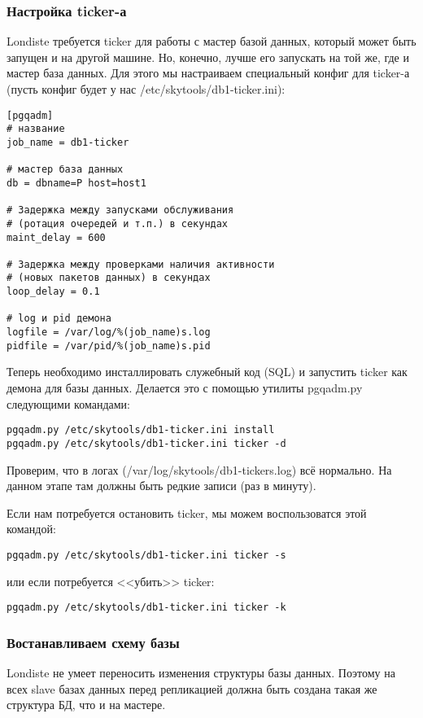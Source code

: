 \subsubsection{Настройка ticker-а}
Londiste требуется ticker для работы с мастер базой данных, который может быть запущен и на другой машине. 
Но, конечно, лучше его запускать на той же, где и мастер база данных. Для этого мы настраиваем специальный 
конфиг для ticker-а (пусть конфиг будет у нас /etc/skytools/db1-ticker.ini):
\begin{lstlisting}[label=lst:londiste5,caption=Настройка ticker-а]
[pgqadm]
# название
job_name = db1-ticker

# мастер база данных 
db = dbname=P host=host1 

# Задержка между запусками обслуживания 
# (ротация очередей и т.п.) в секундах
maint_delay = 600

# Задержка между проверками наличия активности 
# (новых пакетов данных) в секундах
loop_delay = 0.1

# log и pid демона
logfile = /var/log/%(job_name)s.log
pidfile = /var/pid/%(job_name)s.pid
\end{lstlisting}

Теперь необходимо инсталлировать служебный код (SQL) и запустить ticker как демона для базы данных. 
Делается это с помощью утилиты pgqadm.py следующими командами:
\begin{lstlisting}[label=lst:londiste6,caption=Настройка ticker-а]
pgqadm.py /etc/skytools/db1-ticker.ini install
pgqadm.py /etc/skytools/db1-ticker.ini ticker -d
\end{lstlisting}

Проверим, что в логах (/var/log/skytools/db1-tickers.log) всё нормально. На данном этапе там должны быть редкие записи (раз в минуту).

Если нам потребуется остановить ticker, мы можем воспользоватся этой командой:
\begin{lstlisting}[label=lst:londiste7,caption=Настройка ticker-а]
pgqadm.py /etc/skytools/db1-ticker.ini ticker -s
\end{lstlisting}
или если потребуется <<убить>> ticker:
\begin{lstlisting}[label=lst:londiste8,caption=Настройка ticker-а]
pgqadm.py /etc/skytools/db1-ticker.ini ticker -k
\end{lstlisting}

\subsubsection{Востанавливаем схему базы}
Londiste не умеет переносить изменения структуры базы данных. 
Поэтому на всех slave базах данных перед репликацией должна быть создана такая же структура БД, что и на мастере.


